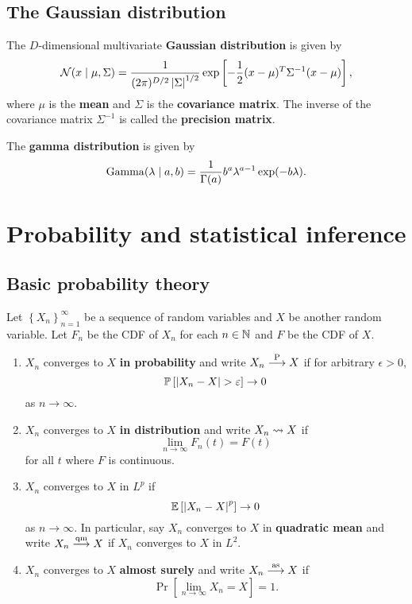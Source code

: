 \documentclass[a4paper]{article}
\begin{document}
\subsection{The Gaussian distribution}

\begin{defi}
The $D$-dimensional multivariate 
\textbf{Gaussian distribution} is given by 
\[
\mathcal{N} (x \mid \mu, \Sigma) 
= \frac{1}{(2\pi)^{D / 2} \left\lvert \Sigma\right\rvert^{1 / 2}}
\exp \left[ -\frac{1}{2} (x - \mu)^T \Sigma^{-1} (x - \mu) 
\right],
\]
where $\mu$ is the \textbf{mean} and $\Sigma$ is the 
\textbf{covariance matrix}.
The inverse of the covariance matrix $\Sigma^{-1}$ 
is called the \textbf{precision matrix}.
\end{defi}

\begin{defi}
The \textbf{gamma distribution} is given by 
\[
\operatorname{Gamma}(\lambda \mid a, b) = 
\frac{1}{\Gamma(a)} b^a \lambda^{a - 1} \exp (-b \lambda).
\]  
\end{defi}

\section{Probability and statistical inference}

\subsection{Basic probability theory}
\begin{defi}
Let $\left\{ X_n \right\}_{n=1}^\infty$ be a sequence of random
variables and $X$ be another random variable. Let
$F_n$ be the CDF of $X_n$ for each $n \in \mathbb{N}$ and $F$
be the CDF of $X$.
\begin{enumerate}
  \item $X_n$ converges to $X$ \textbf{in probability}
  and write $X_n \overset{\mathrm{P}}{\longrightarrow} X$ if for arbitrary
  $\epsilon > 0$,
  \[
  \mathbb{P} \left[ \left\lvert X_n - X\right\rvert > \varepsilon \right] \to 0
  \]
  as $n \to \infty$.

  \item $X_n$ converges to $X$ \textbf{in distribution} and
  write $X_n \rightsquigarrow X$ if
  \[
  \lim_{n \to \infty} F_n(t) = F(t)
  \]
  for all $t$ where $F$ is continuous.

  \item $X_n$ converges to $X$ in $L^p$ if
  \[
  \mathbb{E} \left[ \left\lvert X_n - X\right\rvert^p \right] \to 0
  \]
  as $n \to \infty$. In particular, say $X_n$ converges to
  $X$ in \textbf{quadratic mean} and write $X_n \overset{\mathrm{qm}}{\longrightarrow} X$
  if $X_n$ converges to $X$ in $L^2$.

  \item $X_n$ converges to $X$ \textbf{almost surely}
  and write $X_n \overset{\mathrm{as}}{\longrightarrow} X$ if
  \[
  \Pr \left[ \lim_{n \to \infty} X_n =  X \right] = 1.
  \]
\end{enumerate}
\end{defi}
\end{document}
